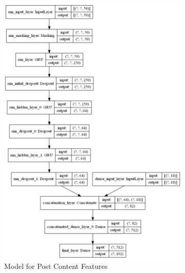 \documentclass[acmsmall]{acmart}
\begin{document}
\begin{figure}[H]
\centering
\begin{subfigure}{.5\textwidth}
\centering
  \includegraphics[width=.9\linewidth]{assets/AuthorAttributionModel_post_content_features.png} %
  \caption{Model for Post Content Features}
  \label{fig:post_content_model}
 \end{subfigure}%
\begin{subfigure}{.5\textwidth}
\centering

\end{subfigure}
\end{figure}
\end{document}

